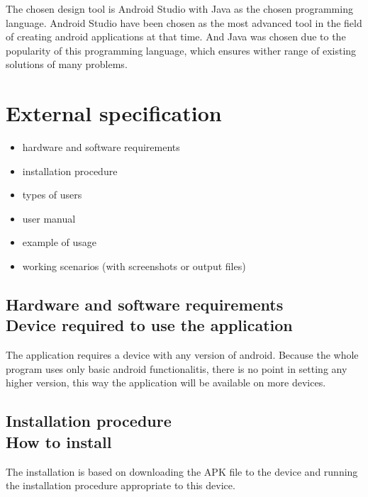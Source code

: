 \documentclass[a4paper,twoside,12pt]{book}
\begin{document}
\par The chosen design tool is Android Studio with Java as the chosen programming language. Android Studio have been chosen as the most advanced tool in the field of creating android applications at that time. And Java was chosen due to the popularity of this programming language, which ensures wither range of existing solutions of many problems.

\chapter{External specification}
\begin{itemize}
\item hardware and software requirements
\item installation procedure
\item types of users
\item user manual
\item example of usage
\item working scenarios (with screenshots or output files)
\end{itemize}

\clearpage
\section{Hardware and software requirements\\{Device required to use the application}}

\par The application requires a device with any version of  android.
Because the whole program uses only basic android functionalitis, there is no point in setting any higher version, this way the application will be available on more devices.


\section {Installation procedure\\{\large How to install}}

\par
The installation is based on downloading the APK file to the device and running the installation procedure appropriate to this device.

\end{document}
